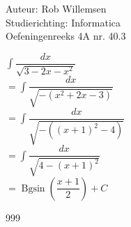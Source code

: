 \documentclass[a4paper]{article}
\newcommand{\dint}{\displaystyle\int}
\newcommand{\Bgsin}{\operatorname{Bgsin}}
\begin{document}
\noindent \large Auteur: Rob Willemsen \\
\noindent \large Studierichting: Informatica \\
\noindent \large Oefeningenreeks 4A nr. 40.3 \\

\medskip

\normalsize

$\dint \dfrac{dx}{\sqrt{3-2x-x^2}}$ \\

$=\dint \dfrac{dx}{\sqrt{-(x^2+2x-3)}}$ \\

$=\dint \dfrac{dx}{\sqrt{-((x+1)^2-4)}}$ \\

$=\dint \dfrac{dx}{\sqrt{4-(x+1)^2}}$ \\

$=\Bgsin\left(\dfrac{x+1}{2}\right) + C$ \\


\begin{thebibliography}{999}
\end{thebibliography}
\end{document}
